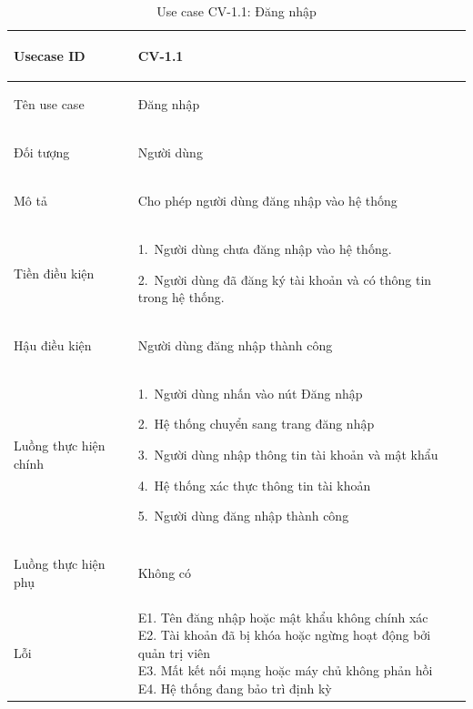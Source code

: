 \begin{table}[H]
    \centering
    \small
    \renewcommand{\arraystretch}{1.0}
    \begin{tabularx}{\textwidth}{|
        >{\bfseries\raggedright\arraybackslash}p{3.2cm}|Y|}
        \hline

        Usecase ID& CV-1.1 \\ \hline

        Tên use case & Đăng nhập \\ \hline

        Đối tượng & Người dùng \\ \hline

        Mô tả & Cho phép người dùng đăng nhập vào hệ thống \\ \hline

        Tiền điều kiện &
        \parbox[t]{\hsize}{
            1.\ Người dùng chưa đăng nhập vào hệ thống.\par
            2.\ Người dùng đã đăng ký tài khoản và có thông tin trong hệ thống.\par
        } \\
        \hline

        Hậu điều kiện & Người dùng đăng nhập thành công \\ \hline

        Luồng thực hiện chính&
        \parbox[t]{\hsize}{
            1.\ Người dùng nhấn vào nút Đăng nhập\par
            2.\ Hệ thống chuyển sang trang đăng nhập\par
            3.\ Người dùng nhập thông tin tài khoản và mật khẩu\par
            4.\ Hệ thống xác thực thông tin tài khoản\par
            5.\ Người dùng đăng nhập thành công}\\
        \hline

        Luồng thực hiện phụ& Không có \\
        \hline

        Lỗi &
        \parbox[t]{\hsize}{
            E1. Tên đăng nhập hoặc mật khẩu không chính xác\\
            E2. Tài khoản đã bị khóa hoặc ngừng hoạt động bởi quản trị viên\\
            E3. Mất kết nối mạng hoặc máy chủ không phản hồi\\
            E4. Hệ thống đang bảo trì định kỳ
        }\\
        \hline

    \end{tabularx}

    \caption{Use case CV-1.1: Đăng nhập}
    \label{tab:usecase-cv11}
\end{table}


